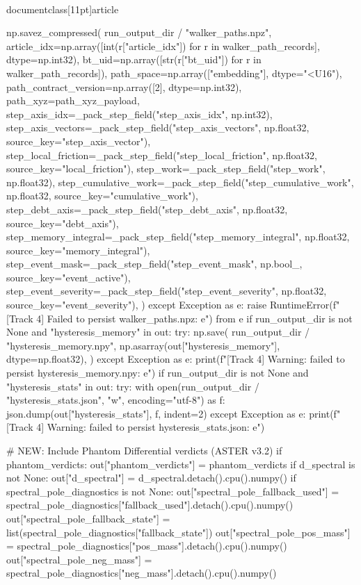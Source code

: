 \\documentclass[11pt]{article}
\begin{document}
\begin{CodeBlock}
                np.savez_compressed(
                    run_output_dir / "walker_paths.npz",
                    article_idx=np.array([int(r["article_idx"]) for r in walker_path_records], dtype=np.int32),
                    bt_uid=np.array([str(r["bt_uid"]) for r in walker_path_records]),
                    path_space=np.array(["embedding"], dtype="<U16"),
                    path_contract_version=np.array([2], dtype=np.int32),
                    path_xyz=path_xyz_payload,
                    step_axis_idx=_pack_step_field("step_axis_idx", np.int32),
                    step_axis_vectors=_pack_step_field("step_axis_vectors", np.float32, source_key="step_axis_vector"),
                    step_local_friction=_pack_step_field("step_local_friction", np.float32, source_key="local_friction"),
                    step_work=_pack_step_field("step_work", np.float32),
                    step_cumulative_work=_pack_step_field("step_cumulative_work", np.float32, source_key="cumulative_work"),
                    step_debt_axis=_pack_step_field("step_debt_axis", np.float32, source_key="debt_axis"),
                    step_memory_integral=_pack_step_field("step_memory_integral", np.float32, source_key="memory_integral"),
                    step_event_mask=_pack_step_field("step_event_mask", np.bool_, source_key="event_active"),
                    step_event_severity=_pack_step_field("step_event_severity", np.float32, source_key="event_severity"),
                )
            except Exception as e:
                raise RuntimeError(f"[Track 4] Failed to persist walker_paths.npz: {e}") from e
        if run_output_dir is not None and "hysteresis_memory" in out:
            try:
                np.save(
                    run_output_dir / "hysteresis_memory.npy",
                    np.asarray(out["hysteresis_memory"], dtype=np.float32),
                )
            except Exception as e:
                print(f"[Track 4] Warning: failed to persist hysteresis_memory.npy: {e}")
        if run_output_dir is not None and "hysteresis_stats" in out:
            try:
                with open(run_output_dir / "hysteresis_stats.json", "w", encoding="utf-8") as f:
                    json.dump(out["hysteresis_stats"], f, indent=2)
            except Exception as e:
                print(f"[Track 4] Warning: failed to persist hysteresis_stats.json: {e}")

        # NEW: Include Phantom Differential verdicts (ASTER v3.2)
        if phantom_verdicts:
            out["phantom_verdicts"] = phantom_verdicts
        if d_spectral is not None:
            out["d_spectral"] = d_spectral.detach().cpu().numpy()
        if spectral_pole_diagnostics is not None:
            out["spectral_pole_fallback_used"] = spectral_pole_diagnostics["fallback_used"].detach().cpu().numpy()
            out["spectral_pole_fallback_state"] = list(spectral_pole_diagnostics["fallback_state"])
            out["spectral_pole_pos_mass"] = spectral_pole_diagnostics["pos_mass"].detach().cpu().numpy()
            out["spectral_pole_neg_mass"] = spectral_pole_diagnostics["neg_mass"].detach().cpu().numpy()


\end{CodeBlock}
\end{document}
